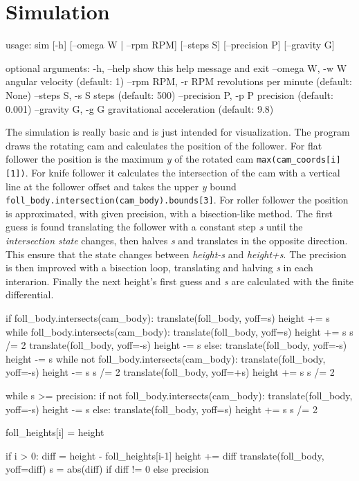 \documentclass[a4paper,10pt,twoside]{article}
\renewenvironment{verbatim}{\begin{minipage}{\linewidth}\begin{oldverbatim}}{\end{oldverbatim}\end{minipage}}
\begin{document}
\section{Simulation}
    \begin{verbatim}
    usage:  sim [-h] [--omega W | --rpm RPM] [--steps S] [--precision P]
                [--gravity G]

    optional arguments:
      -h, --help           show this help message and exit
      --omega W, -w W      angular velocity (default: 1)
      --rpm RPM, -r RPM    revolutions per minute (default: None)
      --steps S, -s S      steps (default: 500)
      --precision P, -p P  precision (default: 0.001)
      --gravity G, -g G    gravitational acceleration (default: 9.8)
    \end{verbatim}
\clearpage
    The simulation is really basic and is just intended for visualization. The program draws the rotating cam and calculates
    the position of the follower. For flat follower the position is the maximum \emph{y} of the rotated cam
    \texttt{max(cam_coords[i][1])}.
    For knife follower it calculates the intersection of the cam with a
    vertical line at the follower offset and takes the upper \emph{y} bound
    \texttt{foll_body.intersection(cam_body).bounds[3]}.
    For roller follower the position is approximated, with given precision, with a bisection-like method.
    The first guess is found translating the follower with a constant step \emph{s} until the \emph{intersection state}
    changes, then halves \emph{s} and translates in the opposite direction.
    This ensure that the state changes between \emph{height-s} and \emph{height+s}.
    The precision is then improved with a bisection loop, translating and halving \emph{s} in each interarion.
    Finally the next height's first guess and \emph{s} are calculated with the finite differential.
    \begin{pycode}
    if foll_body.intersects(cam_body):
        translate(foll_body, yoff=s)
        height += s
        while foll_body.intersects(cam_body):
            translate(foll_body, yoff=s)
            height += s
        s /= 2
        translate(foll_body, yoff=-s)
        height -= s
    else:
        translate(foll_body, yoff=-s)
        height -= s
        while not foll_body.intersects(cam_body):
            translate(foll_body, yoff=-s)
            height -= s
        s /= 2
        translate(foll_body, yoff=+s)
        height += s
    s /= 2

    while s >= precision:
        if not foll_body.intersects(cam_body):
            translate(foll_body, yoff=-s)
            height -= s
        else:
            translate(foll_body, yoff=s)
            height += s
        s /= 2

    foll_heights[i] = height

    if i > 0:
        diff = height - foll_heights[i-1]
        height += diff
        translate(foll_body, yoff=diff)
        s = abs(diff) if diff != 0 else precision
    \end{pycode}
\end{document}
